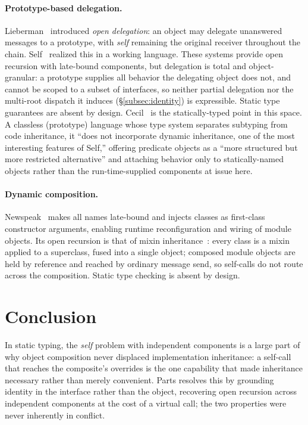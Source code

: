 \documentclass[sigplan,10pt,review,anonymous]{acmart}
\theoremstyle{acmplain}
\begin{document}
\paragraph{Prototype-based delegation.}
Lieberman~\cite{lieberman1986} introduced \emph{open delegation}: an object may
delegate unanswered messages to a prototype, with \emph{self} remaining the
original receiver throughout the chain. Self~\cite{self1987} realized this in a
working language. These systems provide open recursion with late-bound
components, but delegation is total and object-granular: a prototype supplies
all behavior the delegating object does not, and cannot be scoped to a subset
of interfaces, so neither partial delegation nor the multi-root dispatch it
induces (\S\ref{subsec:identity}) is expressible. Static type guarantees are
absent by design. Cecil~\cite{chambers1993} is the statically-typed point in
this space. A classless (prototype) language whose type system separates
subtyping from code inheritance, it ``does not incorporate dynamic inheritance,
one of the most interesting features of Self,'' offering predicate objects as a
``more structured but more restricted alternative'' and attaching behavior only
to statically-named objects rather than the run-time-supplied components at
issue here.

\paragraph{Dynamic composition.}
Newspeak~\cite{bracha2010} makes all names late-bound and injects classes as
first-class constructor arguments, enabling runtime reconfiguration and wiring
of module objects. Its open recursion is that of mixin inheritance~\cite{bracha1990}: every
class is a mixin applied to a superclass, fused into a single object; composed
module objects are held by reference and reached by ordinary message send, so
self-calls do not route across the composition. Static type checking is absent
by design.

\section{Conclusion}

In static typing, the \emph{self} problem with independent components is a
large part of why object composition never displaced implementation inheritance:
a self-call that reaches the composite's overrides is the one capability that
made inheritance necessary rather than merely convenient. Parts resolves this by grounding identity in the interface rather than the
object, recovering open recursion across independent components at the cost of a
virtual call; the two properties were never inherently in conflict.
\end{document}
